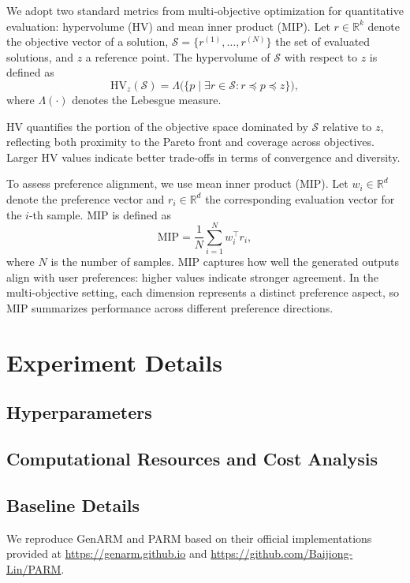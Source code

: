 \documentclass{article}
\begin{document}
We adopt two standard metrics from multi-objective optimization for quantitative evaluation: hypervolume (HV) \citep{zitzler1998multiobjective} and mean inner product (MIP). Let $r \in \mathbb{R}^k$ denote the objective vector of a solution, $\mathcal{S} = \{r^{(1)}, \dots, r^{(N)}\}$ the set of evaluated solutions, and $z$ a reference point. The hypervolume of $\mathcal{S}$ with respect to $z$ is defined as
\begin{equation*}
\mathrm{HV}_z(\mathcal{S}) = \Lambda\big( \{p \mid \exists r \in \mathcal{S}: r \preceq p \preceq z\} \big),
\end{equation*}
where $\Lambda(\cdot)$ denotes the Lebesgue measure.

HV quantifies the portion of the objective space dominated by $\mathcal{S}$ relative to $z$, reflecting both proximity to the Pareto front and coverage across objectives. Larger HV values indicate better trade-offs in terms of convergence and diversity.

To assess preference alignment, we use mean inner product (MIP). Let $w_i \in \mathbb{R}^d$ denote the preference vector and $r_i \in \mathbb{R}^d$ the corresponding evaluation vector for the $i$-th sample. MIP is defined as
\begin{equation*}
\mathrm{MIP} = \frac{1}{N} \sum_{i=1}^{N} w_i^\top r_i,
\end{equation*}
where $N$ is the number of samples.
MIP captures how well the generated outputs align with user preferences: higher values indicate stronger agreement. In the multi-objective setting, each dimension represents a distinct preference aspect, so MIP summarizes performance across different preference directions.

\section{Experiment Details}
\subsection{Hyperparameters}
\subsection{Computational Resources and Cost Analysis}
\subsection{Baseline Details}
We reproduce GenARM and PARM based on their official implementations provided at \url{https://genarm.github.io} and \url{https://github.com/Baijiong-Lin/PARM}.

\newpage

\end{document}

